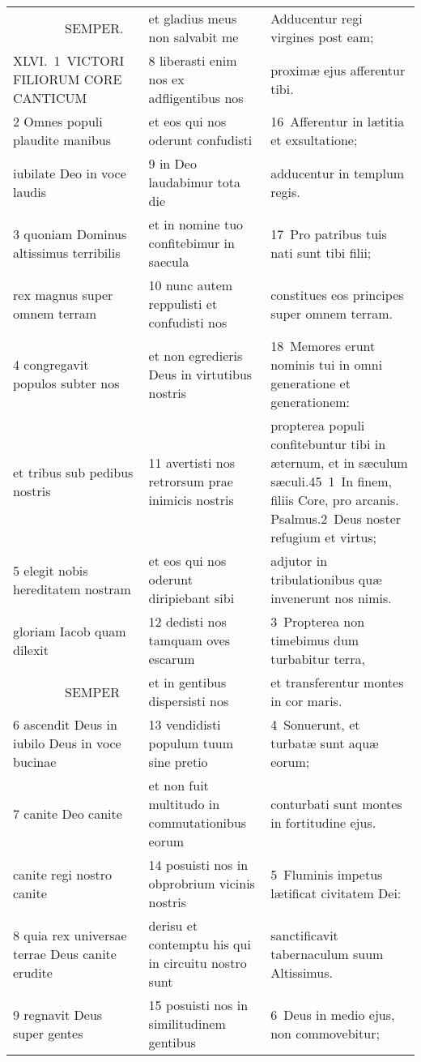 \documentclass{article}
\begin{document}
\begin{longtable}{@{}p{}p{}p{}@{}}
    SEMPER.	&	et gladius meus non salvabit me	&	Adducentur regi virgines post eam;	\\
XLVI. 1 VICTORI FILIORUM CORE CANTICUM	&	8 liberasti enim nos ex adfligentibus nos	&	proximæ ejus afferentur tibi.	\\
2 Omnes populi plaudite manibus	&	et eos qui nos oderunt confudisti	&	16 Afferentur in lætitia et exsultatione;	\\
iubilate Deo in voce laudis	&	9 in Deo laudabimur tota die	&	adducentur in templum regis.	\\
3 quoniam Dominus altissimus terribilis	&	et in nomine tuo confitebimur in saecula	&	17 Pro patribus tuis nati sunt tibi filii;	\\
rex magnus super omnem terram	&	10 nunc autem reppulisti et confudisti nos	&	constitues eos principes super omnem terram.	\\
4 congregavit populos subter nos	&	et non egredieris Deus in virtutibus nostris	&	18 Memores erunt nominis tui in omni generatione et generationem:	\\
et tribus sub pedibus nostris	&	11 avertisti nos retrorsum prae inimicis nostris	&	propterea populi confitebuntur tibi in æternum, et in sæculum sæculi.45 1 In finem, filiis Core, pro arcanis. Psalmus.2 Deus noster refugium et virtus;	\\
5 elegit nobis hereditatem nostram	&	et eos qui nos oderunt diripiebant sibi	&	adjutor in tribulationibus quæ invenerunt nos nimis.	\\
gloriam Iacob quam dilexit	&	12 dedisti nos tamquam oves escarum	&	3 Propterea non timebimus dum turbabitur terra,	\\
    SEMPER	&	et in gentibus dispersisti nos	&	et transferentur montes in cor maris.	\\
6 ascendit Deus in iubilo Deus in voce bucinae	&	13 vendidisti populum tuum sine pretio	&	4 Sonuerunt, et turbatæ sunt aquæ eorum;	\\
7 canite Deo canite	&	et non fuit multitudo in commutationibus eorum	&	conturbati sunt montes in fortitudine ejus.	\\
canite regi nostro canite	&	14 posuisti nos in obprobrium vicinis nostris	&	5 Fluminis impetus lætificat civitatem Dei:	\\
8 quia rex universae terrae Deus canite erudite	&	derisu et contemptu his qui in circuitu nostro sunt	&	sanctificavit tabernaculum suum Altissimus.	\\
9 regnavit Deus super gentes	&	15 posuisti nos in similitudinem gentibus	&	6 Deus in medio ejus, non commovebitur;	\\

\end{longtable}
\end{document}
